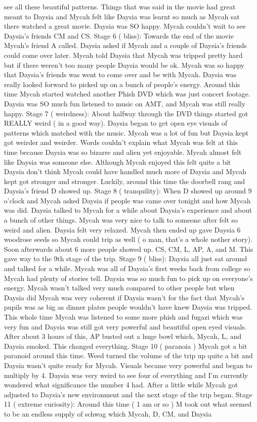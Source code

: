 \documentclass[12pt]{book}
\begin{document}
see all these beautiful patterns. Things that was said in the movie had great meant to Daysia and Mycah felt like Daysia was learnt so much as Mycah sat there watched a great movie. Daysia was SO happy. Mycah couldn't wait to see Daysia's friends CM and CS. Stage 6 ( bliss): Towards the end of the movie Mycah's friend A called. Daysia asked if Mycah and a couple of Daysia's friends could come over later. Mycah told Daysia that Mycah was tripped pretty hard but if there weren't too many people Daysia would be ok. Mycah was so happy that Daysia's friends was went to come over and be with Mycah. Daysia was really looked forward to picked up on a bunch of people's energy. Around this time Mycah started watched another Phish DVD which was just concert footage. Daysia was SO much fun listened to music on AMT, and Mycah was still really happy. Stage 7 ( weirdness): About halfway through the DVD things started got REALLY weird ( in a good way). Daysia began to get open eye visuals of patterns which matched with the music. Mycah was a lot of fun but Daysia kept got weirder and weirder. Words couldn't explain what Mycah was felt at this time because Daysia was so bizarre and alien yet enjoyable. Mycah almost felt like Daysia was someone else. Although Mycah enjoyed this felt quite a bit Daysia don't think Mycah could have handled much more of Daysia and Mycah kept got stronger and stronger. Luckily, around this time the doorbell rang and Daysia's friend D showed up. Stage 8 ( tranquility): When D showed up around 9 o'clock and Mycah asked Daysia if people was came over tonight and how Mycah was did. Daysia talked to Mycah for a while about Daysia's experience and about a bunch of other things. Mycah was very nice to talk to someone after felt so weird and alien. Daysia felt very relaxed. Mycah then ended up gave Daysia 6 woodrose seeds so Mycah could trip as well ( o man, that's a whole nother story). Soon afterwards about 6 more people showed up. CS, CM, L, AP, A, and M. This gave way to the 9th stage of the trip. Stage 9 ( bliss): Daysia all just sat around and talked for a while. Mycah was all of Daysia's first weeks back from college so Mycah had plenty of stories tell. Daysia was so much fun to pick up on everyone's energy. Mycah wasn't talked very much compared to other people but when Daysia did Mycah was very coherent if Daysia wasn't for the fact that Mycah's pupils was as big as dinner plates people wouldn't have knew Daysia was tripped. This whole time Mycah was listened to some more phish and fugazi which was very fun and Daysia was still got very powerful and beautiful open eyed visuals. After about 3 hours of this, AP busted out a huge bowl which, Mycah, L, and Daysia smoked. This changed everything. Stage 10 ( paranoia ) Mycah got a bit paranoid around this time. Weed turned the volume of the trip up quite a bit and Daysia wasn't quite ready for Mycah. Visuals became very powerful and began to multiply by 4. Daysia was very weird to see four of everything and I'm currently wondered what significance the number 4 had. After a little while Mycah got adjusted to Daysia's new environment and the next stage of the trip began. Stage 11 ( extreme curiosity): Around this time ( 1 am or so ) M took out what seemed to be an endless supply of schwag which Mycah, D, CM, and Daysia 
\end{document}

